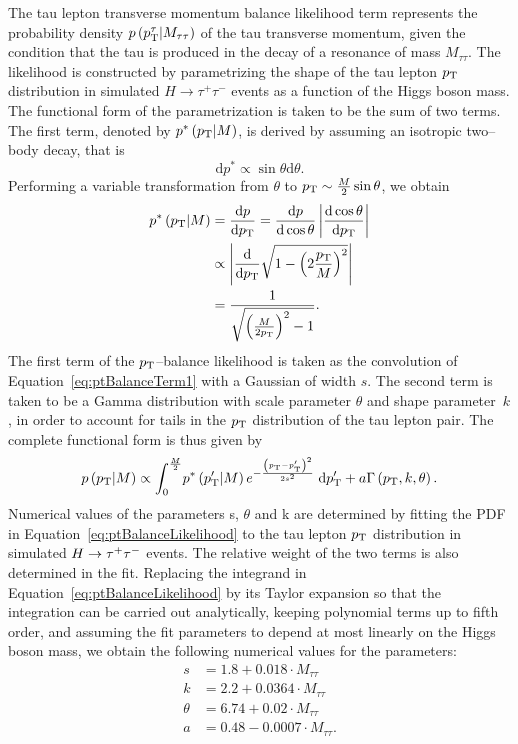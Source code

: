 The tau lepton transverse momentum balance likelihood term represents the
probability density $p \left( p_{\mathrm{T}}^{\tau} | M_{\tau\tau} \right)$ of the tau transverse
momentum, given the condition that the tau is produced in the decay of a resonance of
mass $M_{\tau\tau}$.  The likelihood is constructed by parametrizing the shape
of the tau lepton $p_{\mathrm{T}}$ distribution in simulated $H \to \tau^{+}
\tau^{-}$ events as a function of the Higgs boson mass.  The functional form of the
parametrization is taken to be the sum of two terms.  The first term, denoted by
$p^{*} \left( p_{\mathrm{T}} | M \right)$, is derived by assuming an isotropic two--body
decay, that is
\begin{equation*}
\mathrm{d}p^{*} \propto \sin\theta \mathrm{d}\theta.
\end{equation*}
Performing a variable transformation from $\theta$ to $p_{\mathrm{T}} \sim \frac{M}{2}
\sin\theta$, we obtain
\begin{align}
p^{*} \left( p_{\mathrm{T}} | M \right) &= \frac{\mathrm{d}p}{\mathrm{d}p_{\mathrm{T}}} = \frac{\mathrm{d}p}{\mathrm{d}\cos\theta}
\left| \frac{\mathrm{d}\cos\theta}{\mathrm{d}p_{\mathrm{T}}} \right| \nonumber \\
&\propto \left| \frac{\mathrm{d}}{\mathrm{d}p_{\mathrm{T}}} \sqrt{1 - \left(2 \frac{p_{\mathrm{T}}}{M} \right)^2} \right| \nonumber \\
&= \frac{1}{\sqrt{\left( \frac{M}{2 p_{\mathrm{T}}} \right)^2 - 1}}. 
\label{eq:ptBalanceTerm1}
\end{align}
The first term of the $p_{\mathrm{T}}$--balance likelihood is taken as the convolution of
Equation~\ref{eq:ptBalanceTerm1} with a Gaussian of width $s$.  The second term
is taken to be a Gamma distribution with scale parameter $\theta$ and shape
parameter~$k$, in order to account for tails in the $p_{\mathrm{T}}$ distribution of the
tau lepton pair.  The complete functional form is thus given by
\begin{equation}
p \left( p_{\mathrm{T}} | M \right) \propto \int_0^{\frac{M}{2}} \! p^* \left( p_{\mathrm{T}}' | M \right) 
 e^{-\frac{\left( p_{\mathrm{T}} - p_{\mathrm{T}}' \right)^2}{2 s^2}} \; \mathrm{d}p_{\mathrm{T}}' + a \Gamma \left( p_{\mathrm{T}}, k, \theta \right).
\label{eq:ptBalanceLikelihood}
\end{equation}
Numerical values of the parameters s, $\theta$ and k are determined by fitting
the PDF in Equation~\ref{eq:ptBalanceLikelihood} to the tau lepton $p_{\mathrm{T}}$
distribution in simulated $H \to\tau^+\tau^-$ events.  The relative weight of the
two terms is also determined in the fit.  Replacing the integrand in
Equation~\ref{eq:ptBalanceLikelihood} by its Taylor expansion so that the
integration can be carried out analytically, keeping polynomial terms up to
fifth order, and assuming the fit parameters to depend at most linearly on the
Higgs boson mass, we obtain the following numerical values for the parameters:
\begin{align}
s &= 1.8 + 0.018 \cdot M_{\tau\tau} \nonumber \\
k &= 2.2 + 0.0364 \cdot M_{\tau\tau} \nonumber \\
\theta &= 6.74 + 0.02 \cdot M_{\tau\tau} \nonumber \\
a &= 0.48 - 0.0007 \cdot M_{\tau\tau}. \nonumber 
\end{align}

